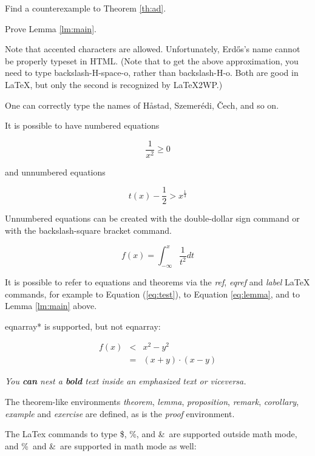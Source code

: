 \documentclass[12pt]{article}
\begin{document}
\begin{exercise} Find a counterexample to Theorem \ref{th:ad}.
\end{exercise}

\begin{exercise}[Advanced] Prove Lemma \ref{lm:main}. \end{exercise}

Note that accented characters are allowed. Unfortunately,
Erd\H os's name cannot be properly typeset in HTML.
(Note that to get the above approximation, you need to type
backslash-H-space-o, rather than backslash-H-{o}. Both are
good in LaTeX, but only the second is recognized by LaTeX2WP.)

One can correctly type the names of H\aa stad, Szemer\'edi,
\v{C}ech, and so on.

It is possible to have numbered equations

\begin{equation} \label{eq:test} \frac 1 {x^2} \ge 0 \end{equation}

and unnumbered equations

$$ t(x) - \frac 12 > x^{\frac 13} $$

Unnumbered equations can be created with the double-dollar sign 
command or with the backslash-square bracket command.

\[ f(x) = \int_{-\infty}^{x} \frac 1 {t^2} dt \]

It is possible to refer to equations and
theorems via the {\em ref}, {\em eqref} and {\em label} LaTeX
commands, for example to Equation (\ref{eq:test}),
to Equation \eqref{eq:lemma},
and to Lemma \ref{lm:main} above.

eqnarray* is supported, but not eqnarray:


\begin{eqnarray*}
f(x) & <  & x^2 - y^2\\
& = & (x+y) \cdot (x-y)
\end{eqnarray*}

{\em You {\bf can} nest a {\bf bold} text inside an emphasized
text or viceversa.}



The theorem-like environments {\em theorem}, {\em lemma},
{\em proposition}, {\em remark}, {\em corollary}, {\em example}
and {\em exercise} are defined, as is the {\em proof} environment.

The LaTex commands to type \$, \%, and \&\ are supported outside
math mode, and \%\ and \&\ are supported in math mode as well:
\end{document}
